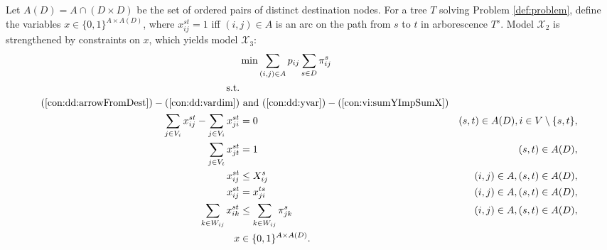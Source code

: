Let $A(D)=A\cap(D\times D)$ be the set of ordered pairs of distinct destination nodes.
For a tree $T$ solving Problem \ref{def:problem}, define the variables $x\in\{0,1\}^{A\times A(D)}$, where
$x_{ij}^{st}=1$ iff $(i,j) \in A$ is an arc on the path from $s$ to $t$ in arborescence $T^s$.
Model $\mathcal{X}_2$ is strengthened by constraints on $x$, which yields model $\mathcal{X}_3$: 
\newline
\newline
\begin{subequations}[resume]\label{eq:smt-x3}
\begin{align}
\notag\makebox[0pt][l]{$\displaystyle{} \min \sum\limits_{(i,j) \in A} p_{ij} \sum\limits_{s \in D} \pi^s_{ij} $}\\
\text{s.t.} \notag \\
(\ref{con:dd:arrowFromDest}) - (\ref{con:dd:vardim}) &\text{ and }(\ref{con:dd:yvar}) - (\ref{con:vi:sumYImpSumX}) \notag\\
\label{con:mf:flowNormal} \sum\limits_{\substack{ j\in V_i}}x^{st}_{ij}-\sum\limits_{\substack{j\in V_i }}x^{st}_{ji} & = 0 & (s,t)\in A(D), i\in V\setminus\{s,t\},\\
\label{con:mf:flowDest} \sum\limits_{\substack{j\in V_t}}x^{st}_{jt}    & = 1  & (s,t)\in A(D),\\
\label{con:mf:fcap} x^{st}_{ij} &\leq X^{s}_{ij}& (i,j)\in A, (s,t)\in A(D),\\
\label{con:mf:fsym} x^{st}_{ij} &=  x^{ts}_{ji}& (i,j)\in A, (s,t)\in A(D),\\ 
\label{con:vi:sumFImpSumY} \sum_{k\in W_{ij}}x^{st}_{ik} & \leq \sum_{k\in W_{ij}} \pi^{s}_{jk} & (i,j)\in A, (s,t)\in A(D),\\
\label{con:mf:xydim} x&\in\{0,1\}^{A\times A(D)}. 
\end{align}~
\end{subequations}


